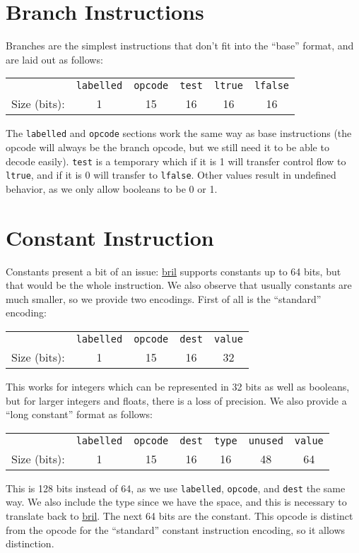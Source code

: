 \documentclass{article}
\newcommand{\bril}{\href{https://capra.cs.cornell.edu/bril/}{bril}}
\begin{document}
\section{Branch Instructions}
Branches are the simplest instructions that don't fit into the ``base'' format,
and are laid out as follows:\\
\begin{center}
  \begin{tabular}{r|c|c|c|c|c|}
    \cline{2-6}
    & \texttt{labelled} & \texttt{opcode} & \texttt{test} & \texttt{ltrue}
    & \texttt{lfalse} \\ \cline{2-6}
    Size (bits): & 1 & 15 & 16 & 16 & 16 \\ \cline{2-6}
  \end{tabular}
\end{center}
The \texttt{labelled} and \texttt{opcode} sections work the same way as base
instructions (the opcode will always be the branch opcode, but we still need it
to be able to decode easily). \texttt{test} is a temporary which if it is 1 will
transfer control flow to \texttt{ltrue}, and if it is 0 will transfer to
\texttt{lfalse}. Other values result in undefined behavior, as we only allow
booleans to be 0 or 1.
\section{Constant Instruction}
Constants present a bit of an issue: \bril{} supports constants up to 64 bits,
but that would be the whole instruction. We also observe that usually constants
are much smaller, so we provide two encodings. First of all is the ``standard''
encoding:\\ 
\begin{center}
  \begin{tabular}{r|c|c|c|c|}
    \cline{2-5}
    & \texttt{labelled} & \texttt{opcode} & \texttt{dest} & \texttt{value}\\
    \cline{2-5}
    Size (bits): & 1 & 15 & 16 & 32 \\ \cline{2-5}
  \end{tabular}
\end{center}
This works for integers which can be represented in 32 bits as well as booleans,
but for larger integers and floats, there is a loss of precision. We also
provide a ``long constant'' format as follows:
\begin{center}
  \begin{tabular}{r|c|c|c|c|c|c|}
    \cline{2-7}
    & \texttt{labelled} & \texttt{opcode} & \texttt{dest} & \texttt{type}
    & \texttt{unused}
    & \texttt{value} \\ \cline{2-7}
    Size (bits): & 1 & 15 & 16 & 16 & 48 & 64 \\ \cline{2-5}
  \end{tabular}
\end{center}
This is 128 bits instead of 64, as we use \texttt{labelled}, \texttt{opcode},
and \texttt{dest}
the same way.
We also include the type since we have the space, and this is necessary to
translate back to \bril{}.
The next 64 bits are the constant. This opcode is distinct
from the opcode for the ``standard'' constant instruction encoding, so it allows
distinction.
\end{document}
